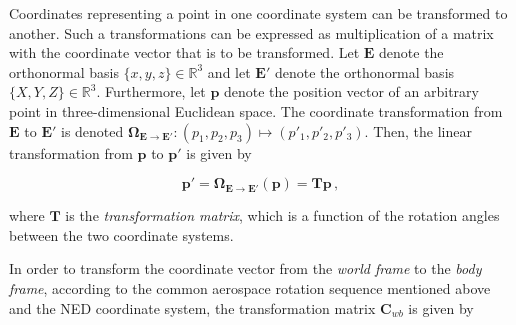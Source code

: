Coordinates representing a point in one coordinate system can be transformed to another. Such a transformations can be expressed as multiplication of a matrix with the coordinate vector that is to be transformed. Let $\mathbf{E}$ denote the orthonormal basis $\{x, y, z\} \in \mathbb{R}^3$ and let $\mathbf{E}'$ denote the orthonormal basis $\{X, Y, Z\} \in \mathbb{R}^3$. Furthermore, let $\mathbf{p}$ denote the position vector of an arbitrary point in three-dimensional Euclidean space. The coordinate transformation from $\mathbf{E}$ to $\mathbf{E}'$ is denoted $\bm{\Omega}_{\mathbf{E} \rightarrow \mathbf{E}'}: (p_1, p_2, p_3) \mapsto (p'_1, p'_2, p'_3)$. Then, the linear transformation from $\mathbf{p}$ to $\mathbf{p}'$ is given by

\begin{equation}\label{eq:transformation}
  \mathbf{p'} = \bm{\Omega}_{\mathbf{E} \rightarrow \mathbf{E}'}(\mathbf{p}) = \mathbf{T} \mathbf{p}\,,
\end{equation}

\noindent
where $\mathbf{T}$ is the \emph{transformation matrix}, which is a function of the rotation angles between the two coordinate systems.

In order to transform the coordinate vector from the \emph{world frame} to the \emph{body frame}, according to the common aerospace rotation sequence mentioned above and the \gls{NED} coordinate system, the transformation matrix $\mathbf{C}_{wb}$ is given by

